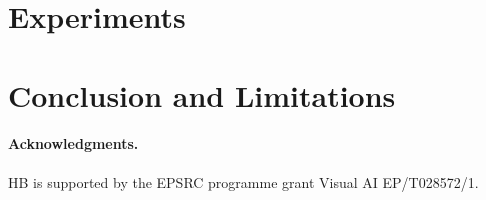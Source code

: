 \documentclass[10pt,twocolumn,letterpaper]{article}
\begin{document}
\section{Experiments}\label{sec:exp}


\section{Conclusion and Limitations}\label{sec:con}


\paragraph{Acknowledgments.} HB is supported by the EPSRC programme grant Visual AI EP/T028572/1.






\clearpage
\appendix

\end{document}
